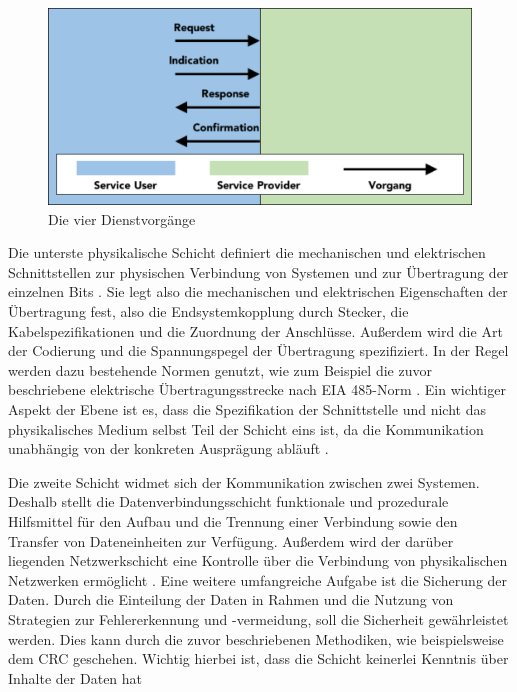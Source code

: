 \begin{figure}
\centering
\includegraphics[width=\textwidth]{abbildungen/20160310_vorgang}
\caption{Die vier Dienstvorgänge}
\label{fig:vorgang}
\end{figure}

Die unterste physikalische Schicht definiert die mechanischen und elektrischen Schnittstellen zur physischen Verbindung von Systemen und zur Übertragung der einzelnen Bits \cite[S.~49f.]{osi96}. Sie legt also die mechanischen und elektrischen Eigenschaften der Übertragung fest, also die Endsystemkopplung durch Stecker, die Kabelspezifikationen und die Zuordnung der Anschlüsse. Außerdem wird die Art der Codierung und die Spannungspegel der Übertragung spezifiziert. In der Regel werden dazu bestehende Normen genutzt, wie zum Beispiel die zuvor beschriebene elektrische Übertragungsstrecke nach EIA 485-Norm \cite[S.~14f.]{schn06}.
Ein wichtiger Aspekt der Ebene ist es, dass die Spezifikation der Schnittstelle und nicht das physikalisches Medium selbst Teil der Schicht eins ist, da die Kommunikation unabhängig von der konkreten Ausprägung abläuft \cite[S.~9]{schn06}.

Die zweite Schicht widmet sich der Kommunikation zwischen zwei Systemen. Deshalb stellt die Datenverbindungsschicht funktionale und prozedurale Hilfsmittel für den Aufbau und die Trennung einer Verbindung sowie den Transfer von Dateneinheiten zur Verfügung. Außerdem  wird der darüber liegenden Netzwerkschicht eine Kontrolle über die Verbindung von physikalischen Netzwerken ermöglicht \cite[S.~46f.]{osi96}.
Eine weitere umfangreiche Aufgabe ist die Sicherung der Daten. Durch die Einteilung der Daten in Rahmen und die Nutzung von Strategien zur Fehlererkennung und -vermeidung, soll die Sicherheit gewährleistet werden. Dies kann durch die zuvor beschriebenen Methodiken, wie beispielsweise dem CRC geschehen. Wichtig hierbei ist, dass die Schicht keinerlei Kenntnis über Inhalte der Daten hat \cite[S.~9ff.]{schn06}

